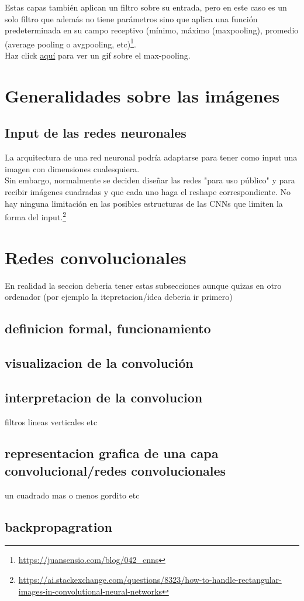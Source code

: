 \documentclass{article}
\begin{document}
Estas capas también aplican un filtro sobre su entrada, pero en este caso es un solo filtro que además no tiene parámetros sino que aplica una función predeterminada en su campo receptivo (mínimo, máximo (maxpooling), promedio (average pooling o avgpooling, etc)\footnote{\url{https://juansensio.com/blog/042_cnns}}.\\

Haz click \href{https://miro.medium.com/max/1456/1*WvHC5bKyrHa7Wm3ca-pXtg.gif}{aquí} para ver un gif sobre el  max-pooling.

\section{Generalidades sobre las imágenes}
\subsection{Input de las redes neuronales}

La arquitectura de una red neuronal podría adaptarse para tener como input una imagen con dimensiones cualesquiera.\\

Sin embargo, normalmente se deciden diseñar las redes "para uso público" y para recibir imágenes cuadradas y que cada uno haga el reshape correspondiente. No hay ninguna limitación en las posibles estructuras de las CNNs que limiten la forma del input.\footnote{\url{https://ai.stackexchange.com/questions/8323/how-to-handle-rectangular-images-in-convolutional-neural-networks}}

\section{Redes convolucionales}
En realidad la seccion deberia tener estas subsecciones aunque quizas en otro ordenador (por ejemplo la itepretacion/idea deberia ir primero)
\subsection{definicion formal, funcionamiento}

\subsection{visualizacion de la convolución}

\subsection{interpretacion de la convolucion}
filtros lineas verticales etc

\subsection{representacion grafica de una capa convolucional/redes convolucionales}
un cuadrado mas o menos gordito etc

\subsection{backpropagration}
\end{document}
